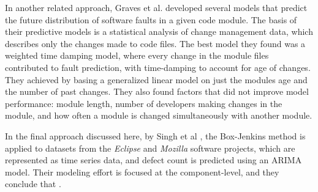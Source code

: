 \documentclass[a4paper]{scrartcl}
\begin{document}
In another related approach, Graves et al.\cite{2000_graves_predicting} developed several models that predict the future distribution of software faults in a given code module. The basis of their predictive models is a statistical analysis of change management data, which describes only the changes made to code files. The best model they found was a weighted time damping model, where every change in the module files contributed to fault prediction, with time-damping to account for age of changes. They achieved  by basing a generalized linear model on just the modules age and the number of past changes. They also found factors that did not improve model performance: module length, number of developers making changes in the module, and how often a module is changed simultaneously with another module.

In the final approach discussed here, by Singh et al \cite{2010_singh_predicting}, the Box-Jenkins method is applied to datasets from the \textit{Eclipse} and \textit{Mozilla} software projects, which are represented as time series data, and defect count is predicted using an ARIMA model. Their modeling effort is focused at the component-level, and they conclude that .
\end{document}
